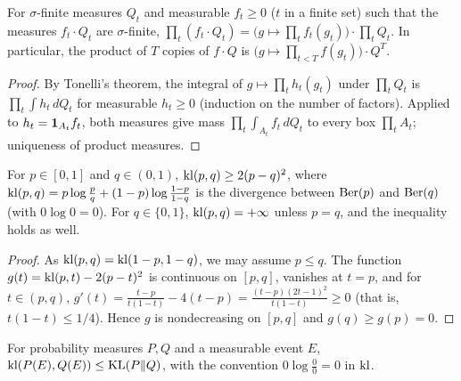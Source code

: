 \begin{lemma}
  \label{lem:pi_withDensity}
  \leanok
  For $\sigma$-finite measures $Q_t$ and measurable $f_t \ge 0$ ($t$ in a finite set) such that the
  measures $f_t \cdot Q_t$ are $\sigma$-finite, $\prod_t (f_t \cdot Q_t)
  = \big(g \mapsto \prod_t f_t(g_t)\big) \cdot \prod_t Q_t$. In particular, the product of $T$
  copies of $f \cdot Q$ is $\big(g \mapsto \prod_{t < T} f(g_t)\big) \cdot Q^T$.
\end{lemma}

\begin{proof}
  \leanok
  By Tonelli's theorem, the integral of $g \mapsto \prod_t h_t(g_t)$ under $\prod_t Q_t$ is
  $\prod_t \int h_t \, dQ_t$ for measurable $h_t \ge 0$ (induction on the number of factors).
  Applied to $h_t = \mathbf{1}_{A_t} f_t$, both measures give mass $\prod_t \int_{A_t} f_t \, dQ_t$
  to every box $\prod_t A_t$; uniqueness of product measures.
\end{proof}

\begin{lemma}
  \label{lem:pinsker_bernoulli}
  \leanok
  For $p \in [0, 1]$ and $q \in (0, 1)$, $\mathrm{kl}(p, q) \ge 2 (p - q)^2$, where
  $\mathrm{kl}(p, q) = p \log\frac{p}{q} + (1 - p) \log \frac{1 - p}{1 - q}$ is the divergence between
  $\mathrm{Ber}(p)$ and $\mathrm{Ber}(q)$ (with $0 \log 0 = 0$). For $q \in \{0, 1\}$, $\mathrm{kl}(p, q) = +\infty$ unless
  $p = q$, and the inequality holds as well.
\end{lemma}

\begin{proof}
  \leanok
  As $\mathrm{kl}(p, q) = \mathrm{kl}(1 - p, 1 - q)$, we may assume $p \le q$. The function
  $g(t) = \mathrm{kl}(p, t) - 2(p - t)^2$ is continuous on $[p, q]$, vanishes at $t = p$, and for
  $t \in (p, q)$, $g'(t) = \frac{t - p}{t(1 - t)} - 4(t - p) = \frac{(t - p)(2t - 1)^2}{t(1 - t)}
  \ge 0$ (that is, $t(1 - t) \le 1/4$). Hence $g$ is nondecreasing on $[p, q]$ and
  $g(q) \ge g(p) = 0$.
\end{proof}

\begin{lemma}
  \label{lem:kl_event_le_klDiv}
  \leanok
  For probability measures $P, Q$ and a measurable event $E$, $\mathrm{kl}(P(E), Q(E)) \le \mathrm{KL}(P \| Q)$,
  with the convention $0 \log \frac{0}{0} = 0$ in $\mathrm{kl}$.
\end{lemma}

